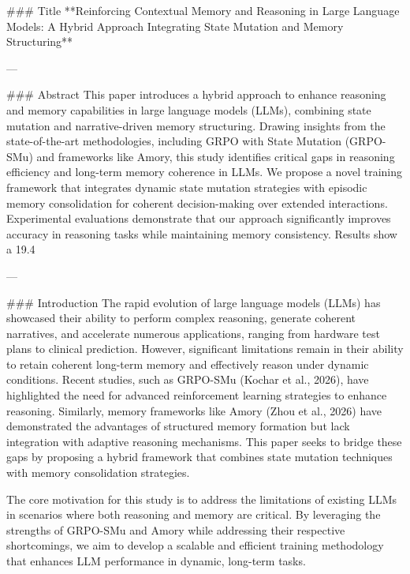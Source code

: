 ### Title  
**Reinforcing Contextual Memory and Reasoning in Large Language Models: A Hybrid Approach Integrating State Mutation and Memory Structuring**

---

### Abstract  
This paper introduces a hybrid approach to enhance reasoning and memory capabilities in large language models (LLMs), combining state mutation and narrative-driven memory structuring. Drawing insights from the state-of-the-art methodologies, including GRPO with State Mutation (GRPO-SMu) and frameworks like Amory, this study identifies critical gaps in reasoning efficiency and long-term memory coherence in LLMs. We propose a novel training framework that integrates dynamic state mutation strategies with episodic memory consolidation for coherent decision-making over extended interactions. Experimental evaluations demonstrate that our approach significantly improves accuracy in reasoning tasks while maintaining memory consistency. Results show a 19.4%

---

### Introduction  
The rapid evolution of large language models (LLMs) has showcased their ability to perform complex reasoning, generate coherent narratives, and accelerate numerous applications, ranging from hardware test plans to clinical prediction. However, significant limitations remain in their ability to retain coherent long-term memory and effectively reason under dynamic conditions. Recent studies, such as GRPO-SMu (Kochar et al., 2026), have highlighted the need for advanced reinforcement learning strategies to enhance reasoning. Similarly, memory frameworks like Amory (Zhou et al., 2026) have demonstrated the advantages of structured memory formation but lack integration with adaptive reasoning mechanisms. This paper seeks to bridge these gaps by proposing a hybrid framework that combines state mutation techniques with memory consolidation strategies.

The core motivation for this study is to address the limitations of existing LLMs in scenarios where both reasoning and memory are critical. By leveraging the strengths of GRPO-SMu and Amory while addressing their respective shortcomings, we aim to develop a scalable and efficient training methodology that enhances LLM performance in dynamic, long-term tasks.

